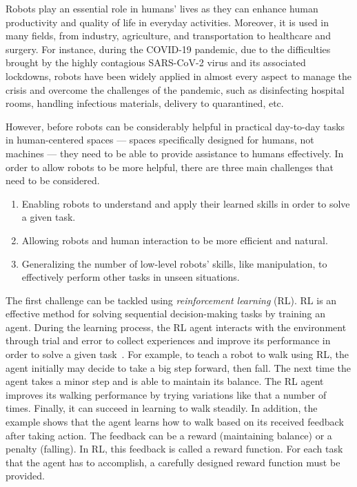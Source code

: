 Robots play an essential role in humans' lives as they can enhance human productivity and quality of life in everyday activities.
Moreover,
it is used in many fields,
from industry,
agriculture,
and transportation to healthcare and surgery.
For instance,
during the COVID-19 pandemic,
due to the difficulties brought by the highly contagious SARS-CoV-2 virus and its associated lockdowns,
robots have been widely applied in almost every aspect to manage the crisis and overcome the challenges of the pandemic,
such as disinfecting hospital rooms,
handling infectious materials,
delivery to quarantined,
etc.~\cite{RobotApplications_Covid19_Raje2021, RobotApplications_Covid19_Spectrum, RobotApplications_Covid19_Jiang2021, RobotApplications_Covid19_Javaid2020, RobotApplications_Covid19_Shen2021}

However,
before robots can be considerably helpful in practical day-to-day tasks in human-centered spaces
--- spaces specifically designed for humans,
not machines
--- they need to be able to provide assistance to humans effectively.
In order to allow robots to be more helpful,
there are three main challenges that need to be considered.

\begin{enumerate}
  \item
        Enabling robots to understand and apply their learned skills in order to solve a given task.
  \item
        Allowing robots and human interaction to be more efficient and natural.
  \item
        Generalizing the number of low-level robots' skills,
        like manipulation,
        to effectively perform other tasks in unseen situations.
\end{enumerate}

The first challenge can be tackled using \textit{reinforcement learning} (RL).
RL is an effective method for solving sequential decision-making tasks by training an agent.
During the learning process,
the RL agent interacts with the environment through trial and error to collect experiences and improve its performance in order to solve a given task~\cite{RL_Sutton2018}.
For example,
to teach a robot to walk using RL,
the agent initially may decide to take a big step forward,
then fall.
The next time the agent takes a minor step and is able to maintain its balance.
The RL agent improves its walking performance by trying variations like that a number of times.
Finally,
it can succeed in learning to walk steadily.
In addition,
the example shows that the agent learns how to walk based on its received feedback after taking action.
The feedback can be a reward (maintaining balance) or a penalty (falling).
In RL,
this feedback is called a reward function.
For each task that the agent has to accomplish,
a carefully designed reward function must be provided.

